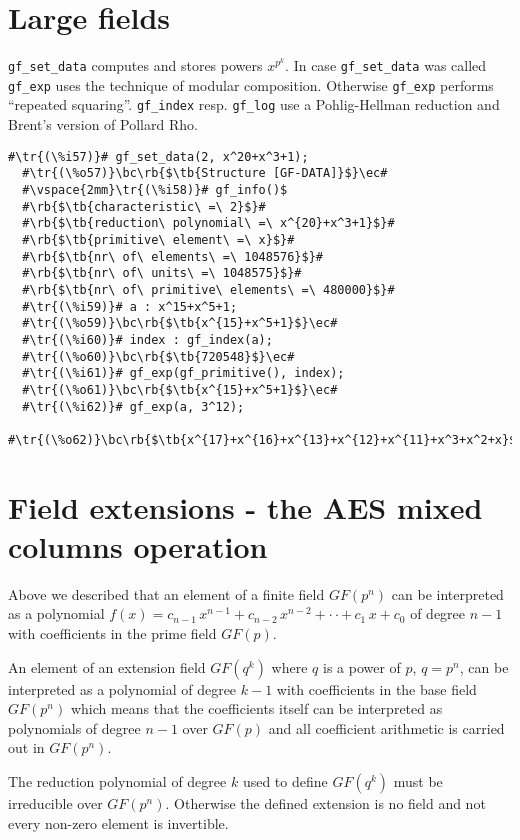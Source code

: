 \documentclass[a4paper,11pt,leqno,fleqn]{artikel3}
\newcommand{\bc}{\begin{center}}
\newcommand{\ec}{\end{center}}
\newcommand{\tr}[1]{\textcolor{red}{#1}}
\newcommand{\tb}[1]{\textcolor{blue}{#1}}
\newcommand{\rb}[1]{\raisebox{2mm}[0mm][1mm]{#1}}
\begin{document}
\section*{Large fields}

\texttt{gf\_set\_data} computes and stores powers $x^{p^k}$. 
In case \texttt{gf\_set\_data} was called \verb!gf_exp! uses the technique 
of modular composition. Otherwise \verb!gf_exp! performs ``repeated squaring''. 
\verb!gf_index! resp. \verb!gf_log! use a 
Pohlig-Hellman reduction and Brent's version of Pollard Rho. 

\vspace*{2mm}
\begin{lstlisting}[escapechar=\#]
  #\tr{(\%i57)}# gf_set_data(2, x^20+x^3+1);
  #\tr{(\%o57)}\bc\rb{$\tb{Structure [GF-DATA]}$}\ec#
  #\vspace{2mm}\tr{(\%i58)}# gf_info()$
  #\rb{$\tb{characteristic\ =\ 2}$}#
  #\rb{$\tb{reduction\ polynomial\ =\ x^{20}+x^3+1}$}#
  #\rb{$\tb{primitive\ element\ =\ x}$}#
  #\rb{$\tb{nr\ of\ elements\ =\ 1048576}$}#
  #\rb{$\tb{nr\ of\ units\ =\ 1048575}$}#
  #\rb{$\tb{nr\ of\ primitive\ elements\ =\ 480000}$}#
  #\tr{(\%i59)}# a : x^15+x^5+1;
  #\tr{(\%o59)}\bc\rb{$\tb{x^{15}+x^5+1}$}\ec#
  #\tr{(\%i60)}# index : gf_index(a);
  #\tr{(\%o60)}\bc\rb{$\tb{720548}$}\ec#
  #\tr{(\%i61)}# gf_exp(gf_primitive(), index);
  #\tr{(\%o61)}\bc\rb{$\tb{x^{15}+x^5+1}$}\ec#
  #\tr{(\%i62)}# gf_exp(a, 3^12);
  #\tr{(\%o62)}\bc\rb{$\tb{x^{17}+x^{16}+x^{13}+x^{12}+x^{11}+x^3+x^2+x}$}\ec#
\end{lstlisting}


\section*{Field extensions - the AES mixed columns operation}

Above we described that an element of a finite field $GF(p^n)$ can be interpreted as a polynomial 
$f(x) = c_{n-1}\,x^{n-1} + c_{n-2}\,x^{n-2} + \cdot \cdot +\,c_1\,x + c_0$
of degree $n-1$ with coefficients in the prime field $GF(p)$. 

An element of an extension field $GF(q^k)$ where $q$ is a power of $p$, $q = p^n$, 
can be interpreted as a polynomial of degree $k-1$ with coefficients in 
the base field $GF(p^n)$ which means that the coefficients itself can be interpreted 
as polynomials of degree $n-1$ over $GF(p)$ and all coefficient arithmetic 
is carried out in $GF(p^n)$. 

The reduction polynomial of degree $k$ used to define $GF(q^k)$ 
must be irreducible over $GF(p^n)$. Otherwise the defined extension is no field and 
not every non-zero element is invertible. 
\end{document}
